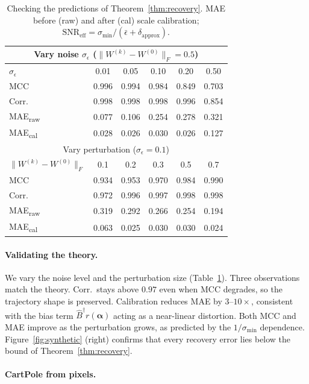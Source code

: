 \documentclass[sigconf,nonacm]{acmart}
\theoremstyle{plain}
\theoremstyle{definition}
\newcommand{\va}{\boldsymbol{\alpha}}
\newcommand{\smin}{\sigma_{\min}}
\newcommand{\dapx}{\delta_{\mathrm{approx}}}
\begin{document}
\begin{table}[t]
\caption{Checking the predictions of Theorem~\ref{thm:recovery}. MAE before (raw) and after (cal) scale calibration; $\mathrm{SNR}_{\text{eff}}=\smin/(\bar\epsilon+\dapx)$.}
\label{tab:snr}
\centering
\footnotesize
\setlength{\tabcolsep}{4pt}
\begin{tabular}{lccccc}
\toprule
\multicolumn{6}{c}{Vary noise $\sigma_\epsilon$ ($\|W^{(k)}-W^{(0)}\|_F=0.5$)}\\
\midrule
$\sigma_\epsilon$ & 0.01 & 0.05 & 0.10 & 0.20 & 0.50 \\
MCC & 0.996 & 0.994 & 0.984 & 0.849 & 0.703 \\
Corr. & 0.998 & 0.998 & 0.998 & 0.996 & 0.854 \\
MAE\textsubscript{raw} & 0.077 & 0.106 & 0.254 & 0.278 & 0.321 \\
MAE\textsubscript{cal} & 0.028 & 0.026 & 0.030 & 0.026 & 0.127 \\
\midrule
\multicolumn{6}{c}{Vary perturbation ($\sigma_\epsilon=0.1$)}\\
\midrule
$\|W^{(k)}-W^{(0)}\|_F$ & 0.1 & 0.2 & 0.3 & 0.5 & 0.7 \\
MCC & 0.934 & 0.953 & 0.970 & 0.984 & 0.990 \\
Corr. & 0.972 & 0.996 & 0.997 & 0.998 & 0.998 \\
MAE\textsubscript{raw} & 0.319 & 0.292 & 0.266 & 0.254 & 0.194 \\
MAE\textsubscript{cal} & 0.063 & 0.025 & 0.030 & 0.030 & 0.024 \\
\bottomrule
\end{tabular}
\end{table}

\paragraph{Validating the theory.}
We vary the noise level and the perturbation size (Table~\ref{tab:snr}). Three observations match the theory. Corr.\ stays above $0.97$ even when MCC degrades, so the trajectory shape is preserved. Calibration reduces MAE by $3$--$10\times$, consistent with the bias term $\hat B^\dagger r(\va)$ acting as a near-linear distortion. Both MCC and MAE improve as the perturbation grows, as predicted by the $1/\smin$ dependence. Figure~\ref{fig:synthetic} (right) confirms that every recovery error lies below the bound of Theorem~\ref{thm:recovery}.

\paragraph{CartPole from pixels.}
\end{document}
